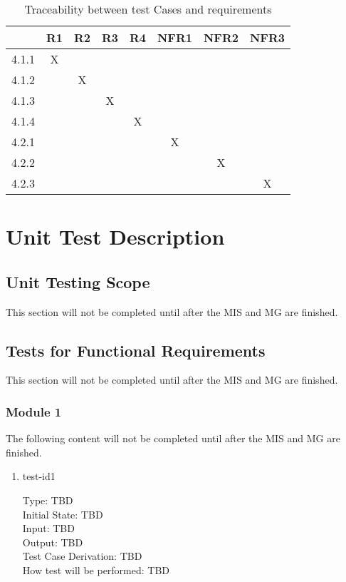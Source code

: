 \documentclass[12pt, titlepage]{article}
\begin{document}
\begin{table}
    \centering
    \begin{tabular}{|c|c|c|c|c|c|c|c|}
    \hline 
         & R1 & R2 & R3 & R4 & NFR1 & NFR2 & NFR3\\
    \hline 
        4.1.1 & X &  &  &  &  &  &\\
    \hline 
        4.1.2 &  & X &  &  &  &  &\\
    \hline 
        4.1.3 &  &  & X &  &  &  &\\
    \hline 
        4.1.4 &  &  &  & X &  &  &\\
    \hline 
        4.2.1 &  &  &  &  & X &  &\\
    \hline 
        4.2.2 &  &  &  &  &  & X &\\
    \hline 
        4.2.3 &  &  &  &  &  &  & X\\
    \hline 
    \end{tabular}
    \caption{Traceability between test Cases and requirements}
    \label{tab:reference table}
\end{table}

\newpage
\section{Unit Test Description} \label{sce:unittests}

\subsection{Unit Testing Scope}
This section will not be completed until after the MIS and MG are finished.

\subsection{Tests for Functional Requirements}
This section will not be completed until after the MIS and MG are finished.

\subsubsection{Module 1}
The following content will not be completed until after the MIS and MG are finished.

\begin{enumerate}

\item{test-id1\\}

Type: TBD \\
Initial State: TBD	\\			
Input: TBD	\\			
Output: TBD \\
Test Case Derivation: TBD \\
How test will be performed: TBD \\
    
\end{enumerate}
\end{document}
